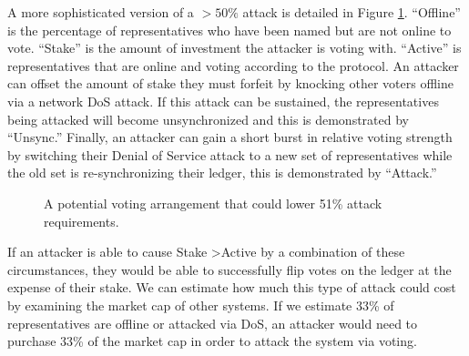 A more sophisticated version of a $>50\%$ attack is detailed in Figure \ref{fig:attack_dist}. ``Offline'' is the percentage of representatives who have been named but are not online to vote. ``Stake'' is the amount of investment the attacker is voting with. ``Active'' is representatives that are online and voting according to the protocol. An attacker can offset the amount of stake they must forfeit by knocking other voters offline via a network DoS attack. If this attack can be sustained, the representatives being attacked will become unsynchronized and this is demonstrated by ``Unsync.'' Finally, an attacker can gain a short burst in relative voting strength by switching their Denial of Service attack to a new set of representatives while the old set is re-synchronizing their ledger, this is demonstrated by ``Attack.''

\begin{figure}[!h]
  \centering
  \caption{A potential voting arrangement that could lower 51\% attack requirements.}
  \label{fig:attack_dist}
\end{figure}

If an attacker is able to cause Stake \textgreater Active by a combination of these circumstances, they would be able to successfully flip votes on the ledger at the expense of their stake. We can estimate how much this type of attack could cost by examining the market cap of other systems. If we estimate 33\% of representatives are offline or attacked via DoS, an attacker would need to purchase 33\% of the market cap in order to attack the system via voting.

